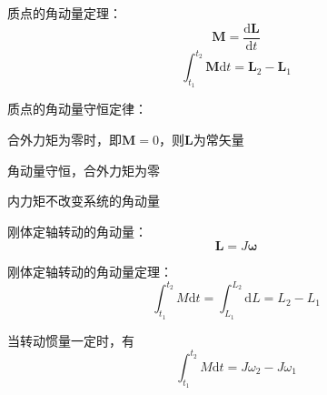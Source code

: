 \documentclass[12pt, a4paper, twoside]{ctexbook}
\begin{document}
{\sonti 质点的角动量定理}：
$$
\boldsymbol{M}=\frac{\mathrm{d}\boldsymbol{L}}{\mathrm{d}t}
$$
$$
\int_{t_1}^{t_2}\boldsymbol{M}\mathrm{d}t=\boldsymbol{L}_2-\boldsymbol{L}_1
$$

{\sonti 质点的角动量守恒定律}：

合外力矩为零时，即$\boldsymbol{M}=0$，则$\boldsymbol{L}$为常矢量

角动量守恒，合外力矩为零

内力矩不改变系统的角动量

{\sonti 刚体定轴转动的角动量}：
$$
\boldsymbol{L}=J\boldsymbol{\omega}
$$

{\sonti 刚体定轴转动的角动量定理}：
$$
\int_{t_1}^{t_2}M\mathrm{d}t=\int_{L_1}^{L_2}\mathrm{d}L=L_2-L_1
$$

当转动惯量一定时，有
$$
\int_{t_1}^{t_2}M\mathrm{d}t=J\omega_2-J\omega_1
$$
\end{document}
